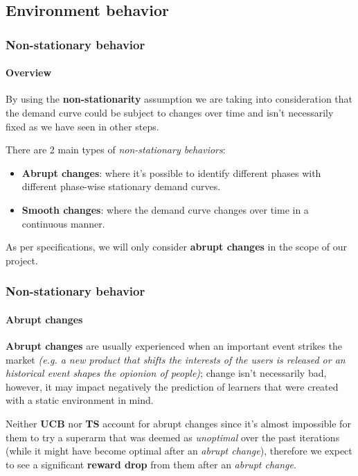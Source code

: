 
\subsection{Environment behavior}


\begin{frame}
\frametitle{Non-stationary behavior}
\framesubtitle{Overview}

By using the \textbf{non-stationarity} assumption we are taking into consideration that the demand curve could be subject to changes over time and isn't necessarily fixed as we have seen in other steps.

There are 2 main types of \textit{non-stationary behaviors}:
\begin{itemize}[label={$\circ$}]
    \item \textbf{Abrupt changes}: where it's possible to identify different phases with different phase-wise stationary demand curves.
    \item \textbf{Smooth changes}: where the demand curve changes over time in a continuous manner.
\end{itemize}

As per specifications, we will only consider \textbf{abrupt changes} in the scope of our project.

\end{frame}


\begin{frame}
\frametitle{Non-stationary behavior}
\framesubtitle{Abrupt changes}

\textbf{Abrupt changes} are usually experienced when an important event strikes the market \textit{(e.g. a new product that shifts the interests of the users is released or an historical event shapes the opionion of people)}; change isn't necessarily bad, however, it may impact negatively the prediction of learners that were created with a static environment in mind.

Neither \textbf{UCB} nor \textbf{TS} account for abrupt changes since it's almost impossible for them to try a superarm that was deemed as \textit{unoptimal} over the past iterations (while it might have become optimal after an \textit{abrupt change}), therefore we expect to see a significant \textbf{reward drop} from them after an \textit{abrupt change}.

\end{frame}


